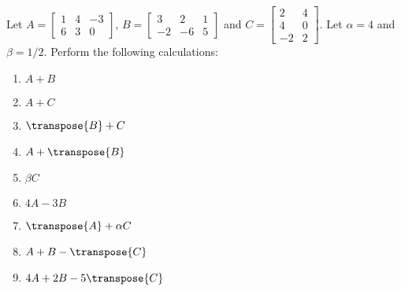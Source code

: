 Let 
$A = \begin{bmatrix} 1 & 4 & -3 \\ 6 & 3 & 0\end{bmatrix}$, 
$B = \begin{bmatrix} 3 & 2 & 1 \\ -2 & -6 & 5\end{bmatrix}$ and 
$C = \begin{bmatrix} 2 & 4 \\ 4 & 0 \\ -2 & 2\end{bmatrix}$.  
Let $\alpha = 4$ and $\beta = 1/2$.  
Perform the following calculations:
%
\begin{enumerate}
\item $A + B$
\item $A + C$
\item $\transpose{B} + C$
\item $A + \transpose{B}$
\item $\beta C$
\item $4A - 3B$
\item $\transpose{A} + \alpha C$
\item $A + B - \transpose{C}$
\item $4A + 2B - 5\transpose{C}$
\end{enumerate}
%